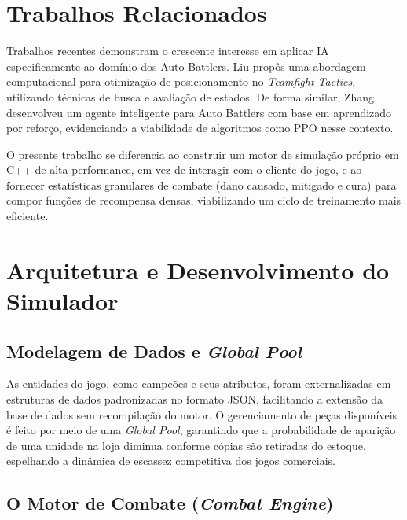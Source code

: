 \documentclass[12pt]{article}
\begin{document}
\section{Trabalhos Relacionados} \label{sec:relacionados}

Trabalhos recentes demonstram o crescente interesse em aplicar IA especificamente ao domínio dos Auto Battlers. Liu \cite{liu2022} propôs uma abordagem computacional para otimização de posicionamento no \textit{Teamfight Tactics}, utilizando técnicas de busca e avaliação de estados. De forma similar, Zhang \cite{zhang2024} desenvolveu um agente inteligente para Auto Battlers com base em aprendizado por reforço, evidenciando a viabilidade de algoritmos como PPO \cite{schulman2017} nesse contexto.

O presente trabalho se diferencia ao construir um motor de simulação próprio em C++ de alta performance, em vez de interagir com o cliente do jogo, e ao fornecer estatísticas granulares de combate (dano causado, mitigado e cura) para compor funções de recompensa densas, viabilizando um ciclo de treinamento mais eficiente.

\section{Arquitetura e Desenvolvimento do Simulador} \label{sec:arquitetura}

\subsection{Modelagem de Dados e \textit{Global Pool}}

As entidades do jogo, como campeões e seus atributos, foram externalizadas em estruturas de dados padronizadas no formato JSON, facilitando a extensão da base de dados sem recompilação do motor. O gerenciamento de peças disponíveis é feito por meio de uma \textit{Global Pool}, garantindo que a probabilidade de aparição de uma unidade na loja diminua conforme cópias são retiradas do estoque, espelhando a dinâmica de escassez competitiva dos jogos comerciais.

\subsection{O Motor de Combate (\textit{Combat Engine})}
\end{document}
